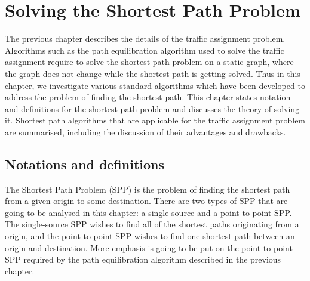 \chapter{Solving the Shortest Path Problem} \label{chap:solvingspp}
The previous chapter describes the details of the traffic assignment problem.
Algorithms such as the path equilibration algorithm used to solve the traffic assignment require to solve the shortest path problem on a static graph, where the graph does not change while the shortest path is getting solved.
Thus in this chapter, we investigate 
various standard algorithms which have been developed 
to address the problem of finding the shortest path.
This chapter states notation and definitions for the shortest path problem and discusses
the theory of solving it.
Shortest path algorithms that are applicable for the traffic assignment problem are summarised,
including the discussion of their advantages and drawbacks.

\section{Notations and definitions}
The Shortest Path Problem (SPP) is the problem of finding the shortest path from a given origin to some destination.
There are two types of SPP that are going to
be analysed in this chapter:
a single-source and a point-to-point SPP.  
The single-source SPP wishes to find all of the shortest paths originating from a origin,
and the point-to-point SPP wishes to find one shortest path between an origin and destination.
More emphasis is going to be put on the point-to-point SPP required by the path equilibration algorithm described in the previous chapter.



